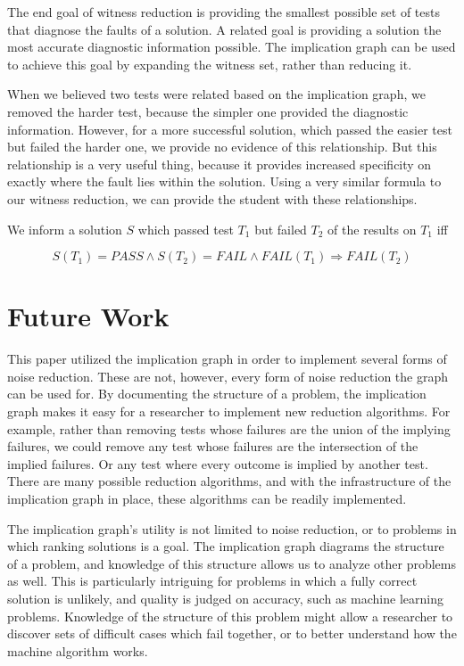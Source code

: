 \documentclass[11pt,twoside]{article}
\begin{document}
The end goal of witness reduction is providing the smallest possible set of tests that diagnose the faults of a solution. A related goal is providing a solution the most accurate diagnostic information possible. The implication graph can be used to achieve this goal by expanding the witness set, rather than reducing it.

When we believed two tests were related based on the implication graph, we removed the harder test, because the simpler one provided the diagnostic information. However, for a more successful solution, which passed the easier test but failed the harder one, we provide no evidence of this relationship. But this relationship is a very useful thing, because it provides increased specificity on exactly where the fault lies within the solution. Using a very similar formula to our witness reduction, we can provide the student with these relationships.

\centerline{We inform a solution $S$ which passed test $T_1$ but failed $T_2$ of the results on  $T_1$ iff}
$$ S(T_1) = PASS \wedge S(T_2) = FAIL \wedge FAIL(T_1) \Rightarrow FAIL(T_2)$$



\section{Future Work}
This paper utilized the implication graph in order to implement several forms of noise reduction. These are not, however, every form of noise reduction the graph can be used for. By documenting the structure of a problem, the implication graph makes it easy for a researcher to implement new reduction algorithms. For example, rather than removing tests whose failures are the union of the implying failures, we could remove any test whose failures are the intersection of the implied failures. Or any test where every outcome is implied by another test. There are many possible reduction algorithms, and with the infrastructure of the implication graph in place, these algorithms can be readily implemented.

The implication graph's utility is not limited to noise reduction, or to problems in which ranking solutions is a goal. The implication graph diagrams the structure of a problem, and knowledge of this structure allows us to analyze other problems as well. This is particularly intriguing for problems in which a fully correct solution is unlikely, and quality is judged on accuracy, such as machine learning problems. Knowledge of the structure of this problem might allow a researcher to discover sets of difficult cases which fail together, or to better understand how the machine algorithm works.
\end{document}
